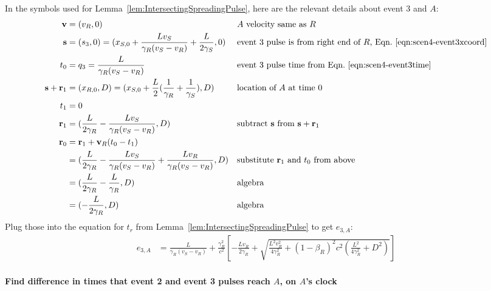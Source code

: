 \documentclass[a4paper]{article}
\theoremstyle{plain}
\theoremstyle{definition}
\newcommand{\vect}[1]{\mathbf{#1}}
\begin{document}
In the symbols used for Lemma~\ref{lem:IntersectingSpreadingPulse},
here are the relevant details about event 3 and $A$:
\begin{align*}
\vect{v} & = (v_R, 0) & & \text{$A$ velocity same as $R$} \\
\vect{s} & = (s_3,0) = (x_{S,0} + \frac{Lv_S}{\gamma_R(v_S - v_R)} + \frac{L}{2\gamma_S}, 0) & & \text{event 3 pulse is from right end of $R$, Eqn.~\eqref{eqn:scen4-event3xcoord}} \\
t_0 & = q_3 = \frac{L}{\gamma_R(v_S - v_R)} & & \text{event 3 pulse time from Eqn.~\eqref{eqn:scen4-event3time}} \\
\vect{s} + \vect{r}_1 & = (x_{R,0}, D) = (x_{S,0} + \frac{L}{2} ( \frac{1}{\gamma_R} + \frac{1}{\gamma_S} ), D) & & \text{location of $A$ at time 0} \\
t_1 & = 0 \\
\vect{r}_1 & = (\frac{L}{2\gamma_R} - \frac{Lv_S}{\gamma_R(v_S - v_R)}, D) & & \text{subtract $\vect{s}$ from $\vect{s}+\vect{r}_1$} \\
\vect{r}_0
  & = \vect{r}_1 + \vect{v}_R(t_0-t_1) \\
  & = (\frac{L}{2\gamma_R} - \frac{Lv_S}{\gamma_R(v_S - v_R)} + \frac{Lv_R}{\gamma_R(v_S - v_R)}, D) & & \text{substitute $\vect{r}_1$ and $t_0$ from above} \\
  & = (\frac{L}{2\gamma_R} - \frac{L}{\gamma_R}, D) & & \text{algebra} \\
  & = (-\frac{L}{2\gamma_R}, D) & & \text{algebra}
\end{align*}
Plug those into the equation for $t_r$ from
Lemma~\ref{lem:IntersectingSpreadingPulse} to get $e_{3,A}$:
\begin{align*}
e_{3,A} & = \frac{L}{\gamma_R(v_S - v_R)} + \frac{\gamma_R^2}{c^2} \left[ -\frac{Lv_R}{2\gamma_R} + \sqrt{\frac{L^2v_R^2}{4\gamma_R^2} + (1-\beta_R)^2c^2 (\frac{L^2}{4\gamma_R^2} + D^2)} \right]
\end{align*}


\paragraph{Find difference in times that event 2 and event 3 pulses reach $A$, on $A$'s clock}
\end{document}
